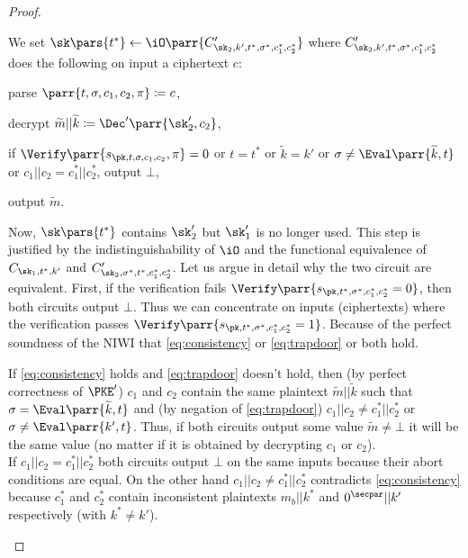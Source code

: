 \begin{proof}
\begin{hybrids}
        \item We set \(\sk\pars{t^*} \gets \iO\parr{C'_{\sk_2,k',t^*,\sigma^*,c^*_1,c^*_2}}\) where \(C'_{\sk_2,k',t^*,\sigma^*,c^*_1,c^*_2}\) does the following on input a ciphertext \(c\):
        \begin{sitemize}
            \item parse \(\parr{t,\sigma,c_1,c_2,\pi} \coloneqq c\),
            \item decrypt \(\widetilde{m}||\widetilde{k} \coloneqq \Dec'\parr{\sk'_2,c_2}\),
            \item if \(\Verify\parr{s_{\pk,t,\sigma,c_1,c_2},\pi} = 0\) or \(t = t^*\) or \(\widetilde{k} = k'\) or \(\sigma \neq \Eval\parr{\widetilde{k},t}\) or \(c_1||c_2 = c^*_1||c^*_2\), output \(\bot\),
            \item output \(\widetilde{m}\).
        \end{sitemize}
        Now, \(\sk\pars{t^*}\) contains \(\sk'_2\) but \(\sk'_1\) is no longer used.
        This step is justified by the indistinguishability of \(\iO\) and the functional equivalence of \(C_{\sk_1,t^*,k'}\) and \(C'_{\sk_2,\sigma^*,t^*,c^*_1,c^*_2}\).
        Let us argue in detail why the two circuit are equivalent.
        First, if the verification fails \(\Verify\parr{s_{\pk,t^*,\sigma^*,c^*_1,c^*_2} = 0}\),
        then both circuits output \(\bot\).
        Thus we can concentrate on inputs (ciphertexts) where the verification passes \(\Verify\parr{s_{\pk,t^*,\sigma^*,c^*_1,c^*_2} = 1}\).
        Because of the perfect soundness of the NIWI that \cref{eq:consistency} or \cref{eq:trapdoor} or both hold.
        \begin{sitemize}
            \item If \cref{eq:consistency} holds and \cref{eq:trapdoor} doesn't hold,
            then (by perfect correctness of \(\PKE'\)) \(c_1\) and \(c_2\) contain the same plaintext \(\widetilde{m}||\widetilde{k}\) such that \(\sigma = \Eval\parr{\widetilde{k},t}\) and (by negation of \cref{eq:trapdoor}) \(c_1||c_2 \neq c^*_1||c^*_2\) or \(\sigma \neq \Eval\parr{k',t}\).
            Thus, if both circuits output some value \(\widetilde{m} \neq \bot\) it will be the same value (no matter if it is obtained by decrypting \(c_1\) or \(c_2\)).
            \\
            If \(c_1||c_2 = c^*_1||c^*_2\) both circuits output \(\bot\) on the same inputs because their abort conditions are equal.
            On the other hand \(c_1||c_2 \neq c^*_1||c^*_2\) contradicts \cref{eq:consistency} because \(c^*_1\) and \(c^*_2\) contain inconsistent plaintexts \(m_b||k^*\) and \(0^\secpar||k'\) respectively (with \(k^* \neq k'\)).


\end{sitemize}
\end{hybrids}
\end{proof}
